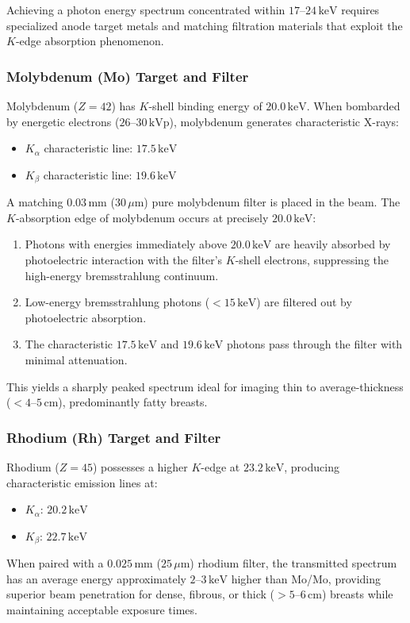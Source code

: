 \documentclass[11pt,a4paper]{article}
\begin{document}
Achieving a photon energy spectrum concentrated within $17\text{--}24\,\text{keV}$ requires specialized anode target metals and matching filtration materials that exploit the $K$-edge absorption phenomenon.

\subsubsection{Molybdenum (Mo) Target and Filter}
Molybdenum ($Z = 42$) has $K$-shell binding energy of $20.0\,\text{keV}$. When bombarded by energetic electrons ($26\text{--}30\,\text{kVp}$), molybdenum generates characteristic X-rays:
\begin{itemize}[leftmargin=*]
    \item $K_{\alpha}$ characteristic line: $17.5\,\text{keV}$
    \item $K_{\beta}$ characteristic line: $19.6\,\text{keV}$
\end{itemize}
A matching $0.03\,\text{mm}$ ($30\,\mu\text{m}$) pure molybdenum filter is placed in the beam. The $K$-absorption edge of molybdenum occurs at precisely $20.0\,\text{keV}$:
\begin{enumerate}
    \item Photons with energies immediately above $20.0\,\text{keV}$ are heavily absorbed by photoelectric interaction with the filter's $K$-shell electrons, suppressing the high-energy bremsstrahlung continuum.
    \item Low-energy bremsstrahlung photons ($< 15\,\text{keV}$) are filtered out by photoelectric absorption.
    \item The characteristic $17.5\,\text{keV}$ and $19.6\,\text{keV}$ photons pass through the filter with minimal attenuation.
\end{enumerate}
This yields a sharply peaked spectrum ideal for imaging thin to average-thickness ($< 4\text{--}5\,\text{cm}$), predominantly fatty breasts.

\subsubsection{Rhodium (Rh) Target and Filter}
Rhodium ($Z = 45$) possesses a higher $K$-edge at $23.2\,\text{keV}$, producing characteristic emission lines at:
\begin{itemize}[leftmargin=*]
    \item $K_{\alpha}$: $20.2\,\text{keV}$
    \item $K_{\beta}$: $22.7\,\text{keV}$
\end{itemize}
When paired with a $0.025\,\text{mm}$ ($25\,\mu\text{m}$) rhodium filter, the transmitted spectrum has an average energy approximately $2\text{--}3\,\text{keV}$ higher than Mo/Mo, providing superior beam penetration for dense, fibrous, or thick ($> 5\text{--}6\,\text{cm}$) breasts while maintaining acceptable exposure times.
\end{document}

